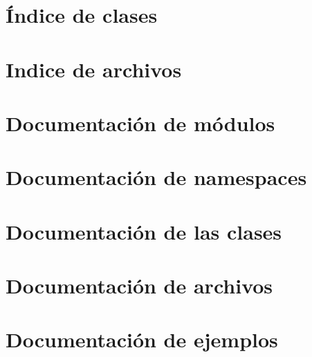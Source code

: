 \documentclass[twoside]{book}
\newcommand{\+}{\discretionary{\mbox{\scriptsize$\hookleftarrow$}}{}{}}
\newcommand{\clearemptydoublepage}{%
    \newpage{\pagestyle{empty}\cleardoublepage}%
  }
\begin{document}
\chapter{Índice de clases}

\chapter{Indice de archivos}

\chapter{Documentación de módulos}





\chapter{Documentación de namespaces}



\chapter{Documentación de las clases}



































\chapter{Documentación de archivos}






















\chapter{Documentación de ejemplos}

  \backmatter
  \newpage
  \clearemptydoublepage
  \printindex
\end{document}
